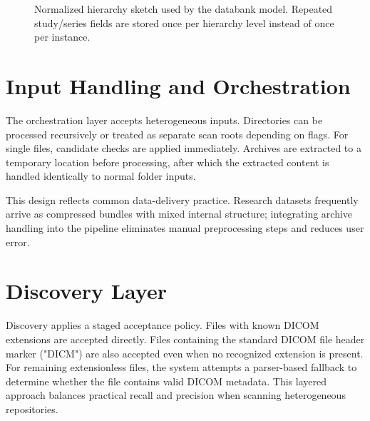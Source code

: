 \begin{figure}[htbp]
\centering
{}
\caption[Normalized hierarchy sketch]{Normalized hierarchy sketch used by the databank model. Repeated study/series fields are stored once per hierarchy level instead of once per instance.}
\label{fig:normalized-schema-sketch}
\end{figure}

\section{Input Handling and Orchestration}
The orchestration layer accepts heterogeneous inputs. Directories can be processed recursively or treated as separate scan roots depending on flags. For single files, candidate checks are applied immediately. Archives are extracted to a temporary location before processing, after which the extracted content is handled identically to normal folder inputs.

This design reflects common data-delivery practice. Research datasets frequently arrive as compressed bundles with mixed internal structure; integrating archive handling into the pipeline eliminates manual preprocessing steps and reduces user error.

\section{Discovery Layer}
Discovery applies a staged acceptance policy. Files with known DICOM extensions are accepted directly. Files containing the standard DICOM file header marker ("DICM") are also accepted even when no recognized extension is present. For remaining extensionless files, the system attempts a parser-based fallback to determine whether the file contains valid DICOM metadata. This layered approach balances practical recall and precision when scanning heterogeneous repositories.

